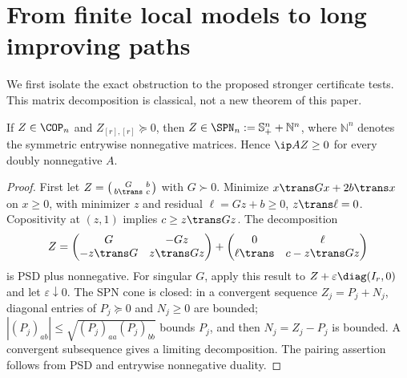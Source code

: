 \section{From finite local models to long improving paths}\label{sec:lifting}
We first isolate the exact obstruction to the proposed stronger certificate tests. This matrix decomposition is classical, not a new theorem of this paper.

\begin{lemma}\label{lem:spn}
If $Z\in\COP_n$ and $Z_{[r],[r]}\succeq0$, then $Z\in\SPN_n:=\mathbb S_+^n+\mathbb N^n$, where $\mathbb N^n$ denotes the symmetric entrywise nonnegative matrices. Hence $\ip A Z\ge0$ for every doubly nonnegative $A$.
\end{lemma}
\begin{proof}
First let $Z=\left(\begin{smallmatrix}G&b\\b\trans&c\end{smallmatrix}\right)$ with $G\succ0$. Minimize $x\trans Gx+2b\trans x$ on $x\ge0$, with minimizer $z$ and residual $\ell=Gz+b\ge0$, $z\trans\ell=0$. Copositivity at $(z,1)$ implies $c\ge z\trans Gz$. The decomposition
\[
 Z=\begin{pmatrix}G&-Gz\\-z\trans G&z\trans Gz\end{pmatrix}
   +\begin{pmatrix}0&\ell\\\ell\trans&c-z\trans Gz\end{pmatrix}
\]
is PSD plus nonnegative. For singular $G$, apply this result to $Z+\varepsilon\diag(I_r,0)$ and let $\varepsilon\downarrow0$. The SPN cone is closed: in a convergent sequence $Z_j=P_j+N_j$, diagonal entries of $P_j\succeq0$ and $N_j\ge0$ are bounded; $|(P_j)_{ab}|\le\sqrt{(P_j)_{aa}(P_j)_{bb}}$ bounds $P_j$, and then $N_j=Z_j-P_j$ is bounded. A convergent subsequence gives a limiting decomposition. The pairing assertion follows from PSD and entrywise nonnegative duality.
\end{proof}

